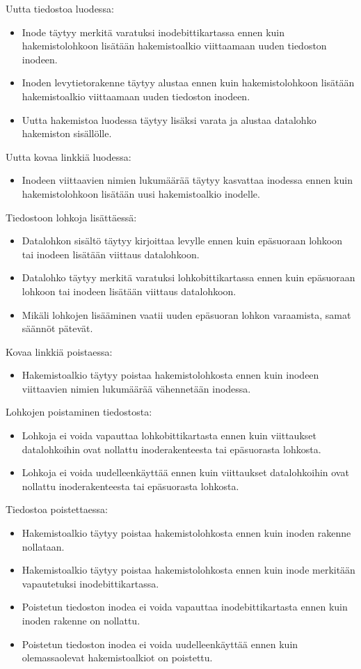 Uutta tiedostoa luodessa:
\begin{itemize}
    \item{Inode täytyy merkitä varatuksi inodebittikartassa ennen kuin hakemistolohkoon lisätään hakemistoalkio viittaamaan uuden tiedoston inodeen.}
    \item{Inoden levytietorakenne täytyy alustaa ennen kuin hakemistolohkoon lisätään hakemistoalkio viittaamaan uuden tiedoston inodeen.}
    \item{Uutta hakemistoa luodessa täytyy lisäksi varata ja alustaa datalohko hakemiston sisällölle.}
\end{itemize}
Uutta kovaa linkkiä luodessa:
\begin{itemize}
    \item{Inodeen viittaavien nimien lukumäärää täytyy kasvattaa inodessa ennen kuin hakemistolohkoon lisätään uusi hakemistoalkio inodelle.}
\end{itemize}
Tiedostoon lohkoja lisättäessä:
\begin{itemize}
    \item{Datalohkon sisältö täytyy kirjoittaa levylle ennen kuin epäsuoraan lohkoon tai inodeen lisätään viittaus datalohkoon.}
    \item{Datalohko täytyy merkitä varatuksi lohkobittikartassa ennen kuin epäsuoraan lohkoon tai inodeen lisätään viittaus datalohkoon.}
    \item{Mikäli lohkojen lisääminen vaatii uuden epäsuoran lohkon varaamista, samat säännöt pätevät.}
\end{itemize}
Kovaa linkkiä poistaessa:
\begin{itemize}
    \item{Hakemistoalkio täytyy poistaa hakemistolohkosta ennen kuin inodeen viittaavien nimien lukumäärää vähennetään inodessa.}
\end{itemize}
Lohkojen poistaminen tiedostosta:
\begin{itemize}
    \item{Lohkoja ei voida vapauttaa lohkobittikartasta ennen kuin viittaukset datalohkoihin ovat nollattu inoderakenteesta tai epäsuorasta lohkosta.}
    \item{Lohkoja ei voida uudelleenkäyttää ennen kuin viittaukset datalohkoihin ovat nollattu inoderakenteesta tai epäsuorasta lohkosta.}
\end{itemize}
Tiedostoa poistettaessa:
\begin{itemize}
    \item{Hakemistoalkio täytyy poistaa hakemistolohkosta ennen kuin inoden rakenne nollataan.}
    \item{Hakemistoalkio täytyy poistaa hakemistolohkosta ennen kuin inode merkitään vapautetuksi inodebittikartassa.}
    \item{Poistetun tiedoston inodea ei voida vapauttaa inodebittikartasta ennen kuin inoden rakenne on nollattu.}
    \item{Poistetun tiedoston inodea ei voida uudelleenkäyttää ennen kuin olemassaolevat hakemistoalkiot on poistettu.}
\end{itemize}

